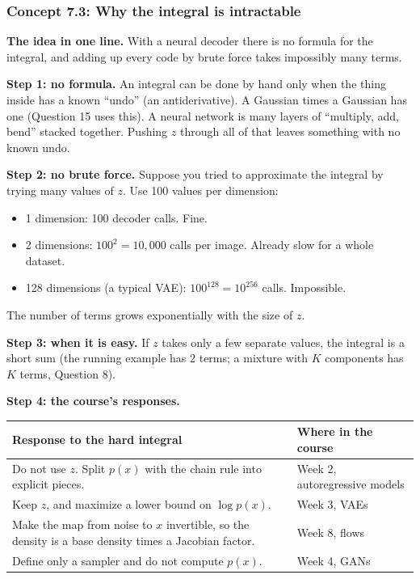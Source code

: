 \documentclass[12pt,a4paper]{article}
\begin{document}
\subsubsection{Concept 7.3: Why the integral is intractable}\label{c7-3}

\textbf{The idea in one line.} With a neural decoder there is no formula for the integral, and adding up every code by brute force takes impossibly many terms.

\textbf{Step 1: no formula.} An integral can be done by hand only when the thing inside has a known ``undo'' (an antiderivative). A Gaussian times a Gaussian has one (Question 15 uses this). A neural network is many layers of ``multiply, add, bend'' stacked together. Pushing $z$ through all of that leaves something with no known undo.

\textbf{Step 2: no brute force.} Suppose you tried to approximate the integral by trying many values of $z$. Use 100 values per dimension:
\begin{itemize}[nosep]
  \item 1 dimension: 100 decoder calls. Fine.
  \item 2 dimensions: $100^2=10{,}000$ calls per image. Already slow for a whole dataset.
  \item 128 dimensions (a typical VAE): $100^{128}=10^{256}$ calls. Impossible.
\end{itemize}
The number of terms grows exponentially with the size of $z$.

\textbf{Step 3: when it is easy.} If $z$ takes only a few separate values, the integral is a short sum (the running example has 2 terms; a mixture with $K$ components has $K$ terms, Question 8).

\textbf{Step 4: the course's responses.}
\begin{center}
\begin{tabular}{@{}>{\raggedright\arraybackslash}p{}>{\raggedright\arraybackslash}p{}@{}}
\toprule
Response to the hard integral & Where in the course \\
\midrule
Do not use $z$. Split $p(x)$ with the chain rule into explicit pieces. & Week 2, autoregressive models \\
Keep $z$, and maximize a lower bound on $\log p(x)$. & Week 3, VAEs \\
Make the map from noise to $x$ invertible, so the density is a base density times a Jacobian factor. & Week 8, flows \\
Define only a sampler and do not compute $p(x)$. & Week 4, GANs \\
\bottomrule
\end{tabular}
\end{center}
\end{document}
